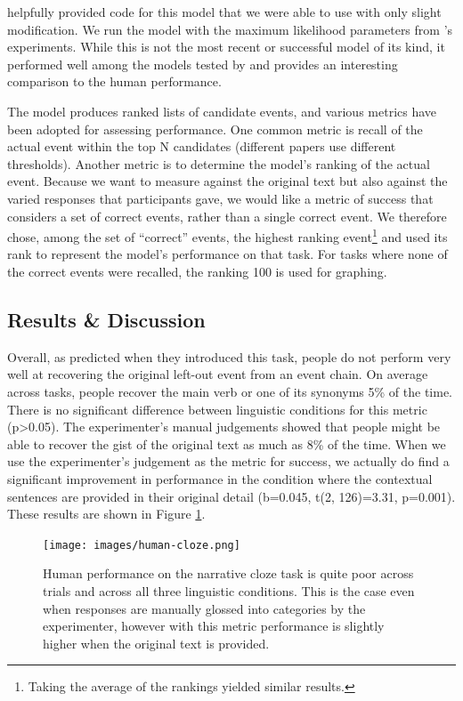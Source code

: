 \documentclass[10pt,a4paper]{article}
\begin{document}
 helpfully provided code for this model that we were able to use with only slight modification.
We run the model with the maximum likelihood parameters from 's experiments.
While this is not the most recent or successful model of its kind, it performed well among the models tested by  and provides an interesting comparison to the human performance.

The model produces ranked lists of candidate events, and various metrics have been adopted for assessing performance.
One common metric is recall of the actual event within the top N candidates (different papers use different thresholds). Another metric is to determine the model's ranking of the actual event. Because we want to measure against the original text but also against the varied responses that participants gave, we would like a metric of success that considers a set of correct events, rather than a single correct event. We therefore chose, among the set of ``correct'' events, the highest ranking event\footnote{Taking the average of the rankings yielded similar results.} and used its rank to represent the model's performance on that task. For tasks where none of the correct events were recalled, the ranking 100 is used for graphing.

\subsection{Results \& Discussion}

Overall, as  predicted when they introduced this task, people do not perform very well at recovering the original left-out event from an event chain. On average across tasks, people recover the main verb or one of its synonyms 5\% of the time. There is no significant difference between linguistic conditions for this metric (p>0.05). The experimenter's manual judgements showed that people might be able to recover the gist of the original text as much as 8\% of the time. When we use the experimenter's judgement as the metric for success, we actually do find a significant improvement in performance in the condition where the contextual sentences are provided in their original detail (b=0.045, t(2, 126)=3.31, p=0.001). These results are shown in Figure \ref{fig:human-cloze}.

\begin{figure}
 \centering
 \texttt{[image: images/human-cloze.png]}
 \caption{Human performance on the narrative cloze task is quite poor across trials and across all three linguistic conditions. This is the case even when responses are manually glossed into categories by the experimenter, however with this metric performance is slightly higher when the original text is provided.}
 \label{fig:human-cloze}
\end{figure}
\end{document}
